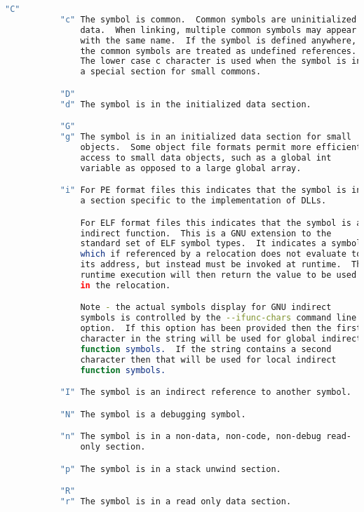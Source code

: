 {{\begin{lstlisting}[language=bash]
           "C"
           "c" The symbol is common.  Common symbols are uninitialized
               data.  When linking, multiple common symbols may appear
               with the same name.  If the symbol is defined anywhere,
               the common symbols are treated as undefined references.
               The lower case c character is used when the symbol is in
               a special section for small commons.

           "D"
           "d" The symbol is in the initialized data section.

           "G"
           "g" The symbol is in an initialized data section for small
               objects.  Some object file formats permit more efficient
               access to small data objects, such as a global int
               variable as opposed to a large global array.

           "i" For PE format files this indicates that the symbol is in
               a section specific to the implementation of DLLs.

               For ELF format files this indicates that the symbol is an
               indirect function.  This is a GNU extension to the
               standard set of ELF symbol types.  It indicates a symbol
               which if referenced by a relocation does not evaluate to
               its address, but instead must be invoked at runtime.  The
               runtime execution will then return the value to be used
               in the relocation.

               Note - the actual symbols display for GNU indirect
               symbols is controlled by the --ifunc-chars command line
               option.  If this option has been provided then the first
               character in the string will be used for global indirect
               function symbols.  If the string contains a second
               character then that will be used for local indirect
               function symbols.

           "I" The symbol is an indirect reference to another symbol.

           "N" The symbol is a debugging symbol.

           "n" The symbol is in a non-data, non-code, non-debug read-
               only section.

           "p" The symbol is in a stack unwind section.

           "R"
           "r" The symbol is in a read only data section.


\end{lstlisting}}}
